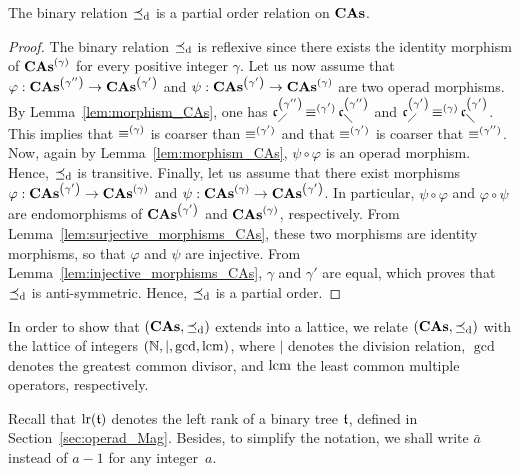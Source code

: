 \begin{Proposition}\label{prop:poset_CAs}
    The binary relation $\preceq_{\mathrm{d}}$ is a partial order relation on
    $\mathbf{CAs}$.
\end{Proposition}
\begin{proof}
    The binary relation $\preceq_{\mathrm{d}}$ is reflexive since there exists the
    identity morphism of $\mathbf{CAs}^{\left(\gamma\right)}$ for every positive integer
    $\gamma$. Let us now assume that
    $\varphi:\mathbf{CAs}^{\left(\gamma''\right)} \to \mathbf{CAs}^{\left(\gamma'\right)}$ and
    $\psi:\mathbf{CAs}^{\left(\gamma'\right)} \to \mathbf{CAs}^{\left(\gamma\right)}$ are two operad morphisms. By
    Lemma~\ref{lem:morphism_CAs}, one has
    $\mathfrak{c}^{\left(\gamma''\right)}_{\diagup} \operatorname{\equiv}^{(\gamma')} \mathfrak{c}^{\left(\gamma''\right)}_{\diagdown}$ and
    $\mathfrak{c}^{\left(\gamma'\right)}_{\diagup} \operatorname{\equiv}^{(\gamma)} \mathfrak{c}^{\left(\gamma'\right)}_{\diagdown}$. This implies
    that $\operatorname{\equiv}^{(\gamma)}$ is coarser than $\operatorname{\equiv}^{(\gamma')}$ and
    that $\operatorname{\equiv}^{(\gamma')}$ is coarser that $\operatorname{\equiv}^{(\gamma'')}$. Now,
    again by Lemma~\ref{lem:morphism_CAs}, $\psi \circ \varphi$ is an
    operad morphism. Hence, $\preceq_{\mathrm{d}}$ is transitive. Finally, let us
    assume that there exist morphisms
    $\varphi:\mathbf{CAs}^{\left(\gamma'\right)}\to\mathbf{CAs}^{\left(\gamma\right)}$ and
    $\psi:\mathbf{CAs}^{\left(\gamma\right)}\to\mathbf{CAs}^{\left(\gamma'\right)}$. In particular,
    $\psi \circ \varphi$ and $\varphi \circ \psi$ are endomorphisms of
    $\mathbf{CAs}^{\left(\gamma'\right)}$ and $\mathbf{CAs}^{\left(\gamma\right)}$, respectively. From
    Lemma~\ref{lem:surjective_morphisms_CAs}, these two morphisms are
    identity morphisms, so that $\varphi$ and $\psi$ are injective. From
    Lemma~\ref{lem:injective_morphisms_CAs}, $\gamma$ and $\gamma'$ are
    equal, which proves that $\preceq_{\mathrm{d}}$ is anti-symmetric. Hence,
    $\preceq_{\mathrm{d}}$ is a partial order.
\end{proof}
\medbreak

In order to show that $\left(\mathbf{CAs}, \preceq_{\mathrm{d}}\right)$ extends into a
lattice, we relate $\left(\mathbf{CAs}, \preceq_{\mathrm{d}}\right)$ with the lattice of
integers $\left(\mathbb{N},\mid, \gcd, \operatorname{lcm}\right)$, where $\mid$ denotes the
division relation, $\gcd$ denotes the greatest common divisor, and
$\operatorname{lcm}$ the least common multiple operators, respectively.
\medbreak

Recall that $\mathrm{lr}(\mathfrak{t})$ denotes the left rank of a binary tree
$\mathfrak{t}$, defined in Section~\ref{sec:operad_Mag}. Besides, to simplify
the notation, we shall write $\bar{a}$ instead of $a - 1$ for any
integer~$a$.
\medbreak

